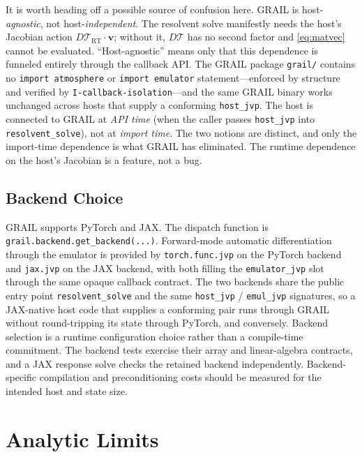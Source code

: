 \documentclass[11pt]{article}
\newcommand{\Tcyc}{\mathcal{T}}
\newcommand{\Trt}{\Tcyc_{\mathrm{RT}}}
\newcommand{\code}[1]{\texttt{#1}}
\begin{document}
It is worth heading off a possible source of confusion here.  GRAIL is
host-\emph{agnostic}, not host-\emph{independent}.  The resolvent
solve manifestly needs the host's Jacobian action $D\Trt \cdot
\mathbf{v}$; without it, $D\Tcyc$ has no second factor and
\eqref{eq:matvec} cannot be evaluated.  ``Host-agnostic'' means only
that this dependence is funneled entirely through the callback API.
The GRAIL package \code{grail/} contains no \code{import atmosphere}
or \code{import emulator} statement---enforced by structure and
verified by \texttt{I-callback-isolation}---and the same GRAIL binary
works unchanged across hosts that supply a conforming
\texttt{host\_jvp}.  The host is connected to GRAIL at \emph{API
time} (when the caller passes \texttt{host\_jvp} into
\code{resolvent\_solve}), not at \emph{import time}.  The two notions
are distinct, and only the import-time dependence is what GRAIL has
eliminated.  The runtime dependence on the host's Jacobian is a
feature, not a bug.

\subsection{Backend Choice}
\label{sec:backend-choice}

GRAIL supports PyTorch and JAX. The dispatch function is
\code{grail.backend.get\_backend(...)}.
Forward-mode automatic differentiation through the emulator is
provided by \code{torch.func.jvp} on the PyTorch backend and
\code{jax.jvp} on the JAX backend, with both filling the
\texttt{emulator\_jvp} slot through the same opaque callback
contract.  The two backends share the public entry point
\code{resolvent\_solve} and the same \texttt{host\_jvp} /
\texttt{emul\_jvp} signatures, so a JAX-native host code that supplies
a conforming pair runs through GRAIL without round-tripping its state
through PyTorch, and conversely.  Backend selection is a runtime
configuration choice rather than a compile-time commitment.  The backend tests exercise their array and linear-algebra contracts,
and a JAX response solve checks the retained backend independently.
Backend-specific compilation and
preconditioning costs should be measured for the intended host and state size.

\section{Analytic Limits}
\label{sec:analytic-limits}
\end{document}
